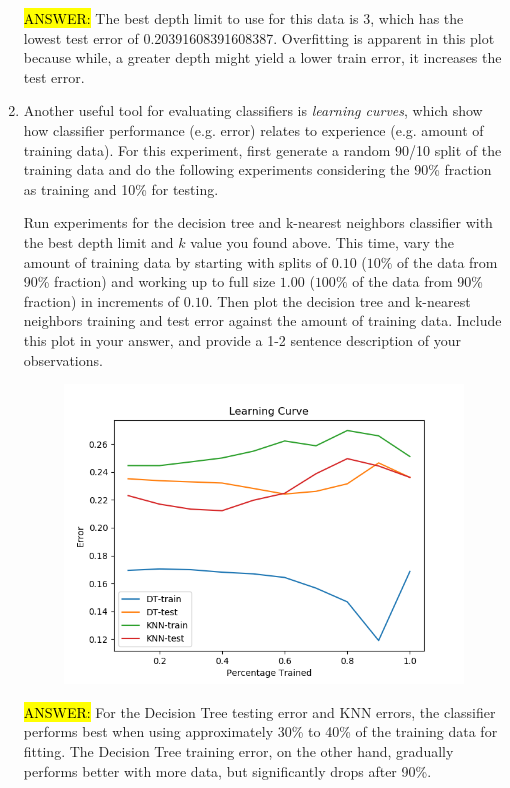 \begin{enumerate}[resume]
\hl{ANSWER:} The best depth limit to use for this data is 3, which has the lowest test error of 0.20391608391608387. Overfitting is apparent in this plot because while, a greater depth might yield a lower train error, it increases the test error.

\item {} Another useful tool for evaluating classifiers is \emph{learning curves}, which show how classifier performance (e.g. error) relates to experience (e.g. amount of training data).
For this experiment, first generate a random 90/10 split of the training data and do the following experiments considering the 90\% fraction as training and 10\% for testing. 

Run experiments for the decision tree and k-nearest neighbors classifier with the best depth limit and $k$ value you found above.
This time, vary the amount of training data by starting with splits of $0.10$ ($10\%$ of the data from 90\% fraction) and working up to full size $1.00$ ($100\%$ of the data from 90\% fraction) in increments of $0.10$. Then plot the decision tree and k-nearest neighbors training and test error against the amount of training data. 
Include this plot in your answer, and provide a 1-2 sentence description of your observations.

\begin{figure}[h]
\centering
\includegraphics[scale=1]{4h.png}
\end{figure}

\hl{ANSWER:} For the Decision Tree testing error and KNN errors, the classifier performs best when using approximately 30\% to 40\% of the training data for fitting. The Decision Tree training error, on the other hand, gradually performs better with more data, but significantly drops after 90\%.

\end{enumerate}


